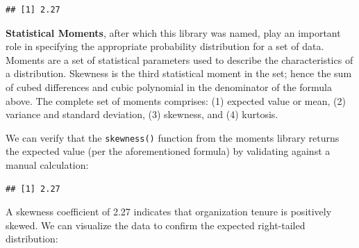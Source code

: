 \documentclass[]{book}
\newenvironment{Shaded}{\begin{snugshade}}{\end{snugshade}}
\newcommand{\CommentTok}[1]{\textcolor[rgb]{0.56,0.35,0.01}{\textit{#1}}}
\newcommand{\DecValTok}[1]{\textcolor[rgb]{0.00,0.00,0.81}{#1}}
\newcommand{\KeywordTok}[1]{\textcolor[rgb]{0.13,0.29,0.53}{\textbf{#1}}}
\newcommand{\NormalTok}[1]{#1}
\newcommand{\OperatorTok}[1]{\textcolor[rgb]{0.81,0.36,0.00}{\textbf{#1}}}
\newcommand{\StringTok}[1]{\textcolor[rgb]{0.31,0.60,0.02}{#1}}
\begin{document}
\begin{verbatim}
## [1] 2.27
\end{verbatim}

\textbf{Statistical Moments}, after which this library was named, play an important role in specifying the appropriate probability distribution for a set of data. Moments are a set of statistical parameters used to describe the characteristics of a distribution. Skewness is the third statistical moment in the set; hence the sum of cubed differences and cubic polynomial in the denominator of the formula above. The complete set of moments comprises: (1) expected value or mean, (2) variance and standard deviation, (3) skewness, and (4) kurtosis.

We can verify that the \texttt{skewness()} function from the moments library returns the expected value (per the aforementioned formula) by validating against a manual calculation:

\begin{Shaded}
\end{Shaded}

\begin{verbatim}
## [1] 2.27
\end{verbatim}

A skewness coefficient of 2.27 indicates that organization tenure is positively skewed. We can visualize the data to confirm the expected right-tailed distribution:
\end{document}
